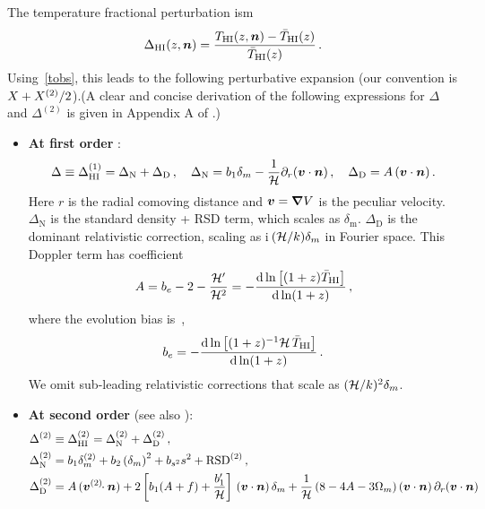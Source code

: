 The temperature fractional perturbation ism
\begin{equation}
\Delta_{{\mathrm{HI}}}(z,\bm {n}) = \frac{T_{{\mathrm{HI}}}(z,\bm {n}) - \bar{T}_{{\mathrm{HI}}} (z)}{\bar{T}_{{\mathrm{HI}}} (z)}\,.\label{e1.1_02}
\end{equation}
Using~\eqref{tobs}, this leads to the following perturbative expansion (our convention is $X+X^{{(2)}}/2$).(A clear and concise derivation of the following expressions for $\Delta$ and $\Delta^{(2)}$ is given in Appendix A of \cite{DiDio:2018zmk}.)
\begin{itemize}
\item 
{\bfseries At first order} \cite{Hall:2012wd}:
\begin{equation} \label{dt1}
\Delta \equiv \Delta^{(1)}_{{\mathrm{HI}}} = \Delta_\mathrm{N} + \Delta_\mathrm{D}\,,\quad  \Delta_\mathrm{N} = b_1\delta_m - \frac{1}{\mathcal{H}} \partial_r(\bm{v}\cdot\bm {n} )\,,\quad \Delta_\mathrm{D}=A\,(\bm{v}\cdot\bm {n} ) \,.
\end{equation}
Here $r$ is the radial comoving distance and $\bm{v}=\bm{\nabla}V$ is the peculiar velocity.
$ \Delta_\mathrm{N}$ is the standard density + RSD term, which scales as $\delta_\mathrm{m}$. $\Delta_\mathrm{D}$ is the dominant relativistic correction, scaling as i\,$(\mathcal{H}/k)\delta_m$ in Fourier space. This Doppler term has coefficient
\begin{equation}
A = b_e - 2 - \frac{\mathcal{H}'}{\mathcal{H}^{2}}= -\frac{\mathrm{d} \ln \left[(1+z) \bar{T}_{{\mathrm{HI}}} \right]}{\mathrm{d} \ln (1+z)} \,,
 \label{eq:AcoeffTrel}
\end{equation}
where the evolution bias is~\cite{Fonseca:2015laa},
\begin{equation}
b_e = -\frac{\mathrm{d} \ln \left[(1+z)^{-1}\mathcal{H}\, \bar{T}_{{\mathrm{HI}}} \right]}{\mathrm{d} \ln (1+z)}\,.
\end{equation}
We omit sub-leading relativistic corrections that scale as $(\mathcal{H}/k)^2\delta_m$. 
%
%
\item
{\bfseries At second order}
\cite{Maartens:2019yhx} (see also \cite{Umeh:2015gza,DiDio:2015bua,Umeh:2016thy,Clarkson:2018dwn,DiDio:2018zmk}):
\begin{align}
\Delta^{\tw} &\equiv \Delta^{(2)}_{\hi} = \Delta^{\tw}_\mathrm{N} + \Delta^{\tw}_\mathrm{D} \,,\\
\Delta^{\tw}_\mathrm{N}&= b_1\delta_m^{\tw}+b_2 \left(\delta_m \right)^2+ b_{s^2}s^2 + \mathrm{RSD}^{\tw}\,,
\label{d2n} \\
\Delta^{\tw}_\mathrm{D} &= A\, (\v^{(2)}\!\!\cdot\n)+2\left[ b_{1} (A+f) + \frac{b_1'}{\cH}\right]\,(\v\cdot\n)\,\delta_m +\frac{1}{\cH}\left( 8 - 4 A-3 \Omega_m \right)(\v\cdot\n)\,\partial_r(\v \cdot \n)

\end{align}
\end{itemize}
